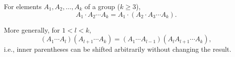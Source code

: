 For elements $A_1, A_2, \ldots, A_k$ of a group ($k \geq 3$),
$$A_1 \cdot A_2 \cdots A_k = A_1 \cdot (A_2 \cdot A_3 \cdots A_k).$$

More generally, for $1 < l < k$,
$$(A_1 \cdots A_l)(A_{l+1} \cdots A_k) = (A_1 \cdots A_{l-1})(A_l A_{l+1} \cdots A_k),$$
i.e., inner parentheses can be shifted arbitrarily without changing the result.
